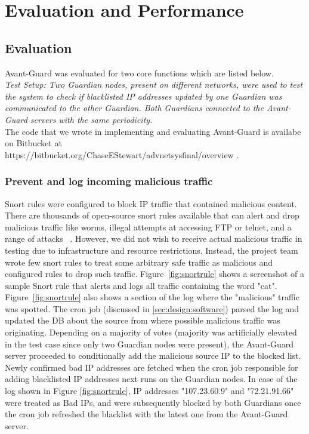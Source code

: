 \section{Evaluation and Performance}
\label{sec:eval}
\subsection{Evaluation}
Avant-Guard was evaluated for two core functions which are listed below.\\
\textit{Test Setup: Two Guardian nodes, present on different networks, were used to test the system to check if blacklisted IP addresses updated by one Guardian was communicated to the other Guardian. Both Guardians connected to the Avant-Guard servers with the same periodicity.} \\
The code that we wrote in implementing and evaluating Avant-Guard is availabe on Bitbucket at \\ https://bitbucket.org/ChaseEStewart/advnetsysfinal/overview \cite{us}.
\subsubsection{Prevent and log incoming malicious traffic}
\label{sec:eval:preventout}

 Snort rules were configured to block IP traffic that contained malicious content. There are thousands of open-source snort rules available that can alert and drop malicious traffic like worms, illegal attempts at accessing FTP or telnet, and a range of attacks ~\cite{Roesch:1999:SLI:1039834.1039864}. However, we did not wish to receive actual malicious traffic in testing due to infrastructure and resource restrictions. Instead, the project team wrote few snort rules to treat some arbitrary safe traffic as malicious and configured rules to drop such traffic. Figure~\ref{fig:snortrule} shows a screenshot of a sample Snort rule that alerts and logs all traffic containing the word "cat". Figure~\ref{fig:snortrule} also shows a section of the log where the "malicious" traffic was spotted. The cron job (discussed in \ref{sec:design:software}) parsed the log and updated the DB about the source from where possible malicious traffic was originating. Depending on a majority of votes (majority was artificially elevated in the test case since only two Guardian nodes were present), the Avant-Guard server proceeded to conditionally add the malicious source IP to the blocked list. Newly confirmed bad IP addresses are fetched when the cron job responsible for adding blacklisted IP addresses next runs on the Guardian nodes. In case of the log shown in Figure \ref{fig:snortrule}, IP addresses "107.23.60.9" and "72.21.91.66" were treated as Bad IPs, and were subsequently blocked by both Guardians once the cron job refreshed the blacklist with the latest one from the Avant-Guard server.

